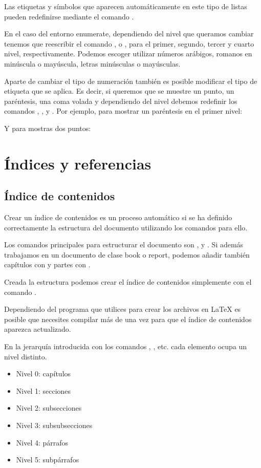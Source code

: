 \documentclass[11pt, a4paper]{article}
\begin{document}
Las etiquetas y símbolos que aparecen automáticamente en este tipo de listas pueden redefinirse mediante el comando .

En el caso del entorno enumerate, dependiendo del nivel que queramos cambiar tenemos que reescribir el comando ,  o , para el primer, segundo, tercer y cuarto nivel, respectivamente. Podemos escoger utilizar números arábigos, romanos en minúscula o mayúscula, letras minúsculas o mayúsculas.

Aparte de cambiar el tipo de numeración también es posible modificar el tipo de etiqueta que se aplica. Es decir, si queremos que se muestre un punto, un paréntesis, una coma volada y dependiendo del nivel debemos redefinir los comandos , ,  y . Por ejemplo, para mostrar un paréntesis en el primer nivel:


Y para mostras dos puntos:


\section{Índices y referencias}

\subsection{Índice de contenidos}

Crear un índice de contenidos es un proceso automático si se ha definido correctamente la estructura del documento utilizando los comandos para ello.

Los comandos principales para estructurar el documento son ,  y . Si además trabajamos en un documento de clase book o report, podemos añadir también capítulos con  y partes con .

Creada la estructura podemos crear el índice de contenidos simplemente con el comando .

Dependiendo del programa que utilices para crear los archivos en LaTeX es posible que necesites compilar más de una vez para que el índice de contenidos aparezca actualizado.

En la jerarquía introducida con los comandos , , etc. cada elemento ocupa un nivel distinto.
\begin{itemize}
\item Nivel 0: capítulos
\item Nivel 1: secciones
\item Nivel 2: subsecciones
\item Nivel 3: subsubsecciones
\item Nivel 4: párrafos
\item Nivel 5: subpárrafos
\end{itemize}
\end{document}
